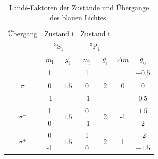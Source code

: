 \begin{table}
    \centering
    \caption{Landé-Faktoren der Zustände und Übergänge des blauen Lichtes.}
    \label{tab:blauÜber}
    \begin{tabular}{c| c c| c c| c c}
        \toprule
        Übergang&\multicolumn{2}{c|}{Zustand i}&\multicolumn{2}{c|}{Zustand i}&\\
                &\multicolumn{2}{c|}{$^3\text{S}_1$}&\multicolumn{2}{c|}{$^3\text{P}_1$}&\\
        \midrule
        &$m_\text{i}$&$g_\text{i}$&$m_\text{j}$&$g_\text{j}$&$\Delta m $&$g_{\text{ij}}$\\
        \midrule
        \multirow{3}{*}{$\pi$}&1&\multirow{3}{*}{$\num{1.5}$}&1&\multirow{3}{*}{2}&\multirow{3}{*}{0}&$\num{-0.5}$\\
        &0&&0&&&0\\
        &-1&&-1&&&$\num{0.5}$\\
        \hline
        \multirow{2}{*}{$\sigma^-$}&1&\multirow{2}{*}{$\num{1.5}$}&0&\multirow{2}{*}{2}&\multirow{2}{*}{-1}&$\num{1.5}$\\
        &0&&-1&&&2\\
        \hline
        \multirow{2}{*}{$\sigma^+$}&0&\multirow{2}{*}{$\num{1.5}$}&1&\multirow{2}{*}{2}&\multirow{2}{*}{1}&-2\\
        &-1&&0&&&$\num{-1.5}$\\
        \bottomrule
    \end{tabular}
\end{table}
